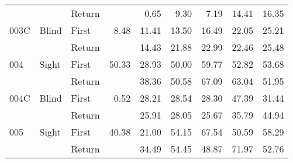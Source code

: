 \begin{table}[!htb]
\begin{tabular}{lllrrrrrr}
    &       & Return &          &   0.65 &   9.30 &                                                  7.19 &                                                  14.41 &   16.35 \\
003C & Blind & First &     8.48 &  11.41 &  13.50 &                                                 16.49 &                                                  22.05 &   25.21 \\
    &       & Return &          &  14.43 &  21.88 &                                                 22.99 &                                                  22.46 &   25.48 \\
004 & Sight & First &    50.33 &  28.93 &  50.00 &                                                 59.77 &                                                  52.82 &   53.68 \\
    &       & Return &          &  38.36 &  50.58 &                                                 67.09 &                                                  63.04 &   51.95 \\
004C & Blind & First &     0.52 &  28.21 &  28.54 &                                                 28.30 &                                                  47.39 &   31.44 \\
    &       & Return &          &  25.91 &  28.05 &                                                 25.67 &                                                  35.79 &   44.94 \\
005 & Sight & First &    40.38 &  21.00 &  54.15 &                                                 67.54 &                                                  50.59 &   58.29 \\
    &       & Return &          &  34.49 &  54.45 &                                                 48.87 &                                                  71.97 &   52.76 \\
\bottomrule
\end{tabular}
\end{table}

